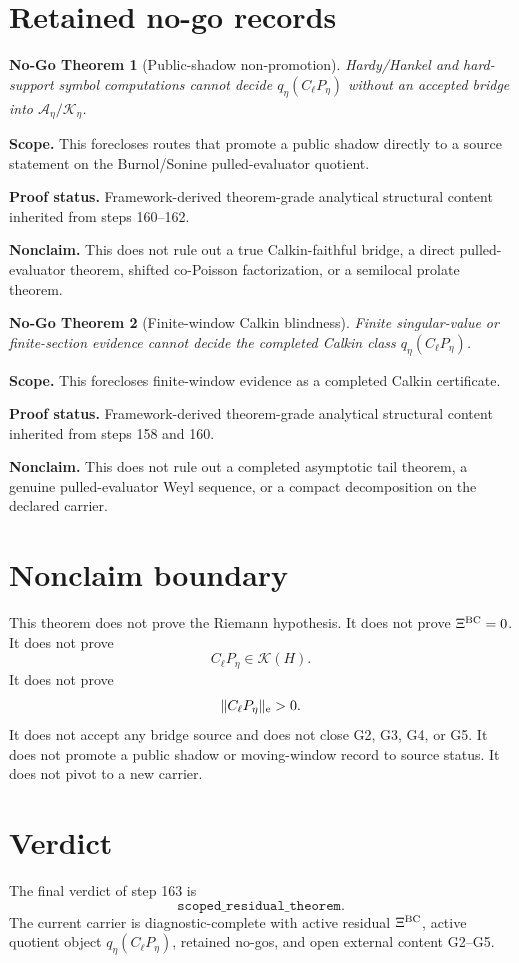 \documentclass[11pt]{article}
\newtheorem{nogo}{No-Go Theorem}
\begin{document}
\section{Retained no-go records}

\begin{nogo}[Public-shadow non-promotion]
Hardy/Hankel and hard-support symbol computations cannot decide
\(q_\eta(C_\ell P_\eta)\) without an accepted bridge into
\(\mathcal A_\eta/\mathcal K_\eta\).
\end{nogo}

\noindent\textbf{Scope.} This forecloses routes that promote a public shadow
directly to a source statement on the Burnol/Sonine pulled-evaluator quotient.

\noindent\textbf{Proof status.} Framework-derived theorem-grade analytical
structural content inherited from steps 160--162.

\noindent\textbf{Nonclaim.} This does not rule out a true Calkin-faithful
bridge, a direct pulled-evaluator theorem, shifted co-Poisson factorization, or
a semilocal prolate theorem.

\begin{nogo}[Finite-window Calkin blindness]
Finite singular-value or finite-section evidence cannot decide the completed
Calkin class \(q_\eta(C_\ell P_\eta)\).
\end{nogo}

\noindent\textbf{Scope.} This forecloses finite-window evidence as a completed
Calkin certificate.

\noindent\textbf{Proof status.} Framework-derived theorem-grade analytical
structural content inherited from steps 158 and 160.

\noindent\textbf{Nonclaim.} This does not rule out a completed asymptotic
tail theorem, a genuine pulled-evaluator Weyl sequence, or a compact
decomposition on the declared carrier.

\section{Nonclaim boundary}

This theorem does not prove the Riemann hypothesis.  It does not prove
\(\Xi^{\rm BC}=0\).  It does not prove
\[
  C_\ell P_\eta\in\mathcal K(H).
\]
It does not prove
\[
  \|C_\ell P_\eta\|_{\rm e}>0.
\]
It does not accept any bridge source and does not close G2, G3, G4, or G5.  It
does not promote a public shadow or moving-window record to source status.  It
does not pivot to a new carrier.

\section{Verdict}

The final verdict of step 163 is
\[
  \boxed{\texttt{scoped\_residual\_theorem}.}
\]
The current carrier is diagnostic-complete with active residual
\(\Xi^{\rm BC}\), active quotient object \(q_\eta(C_\ell P_\eta)\), retained
no-gos, and open external content G2--G5.
\end{document}

